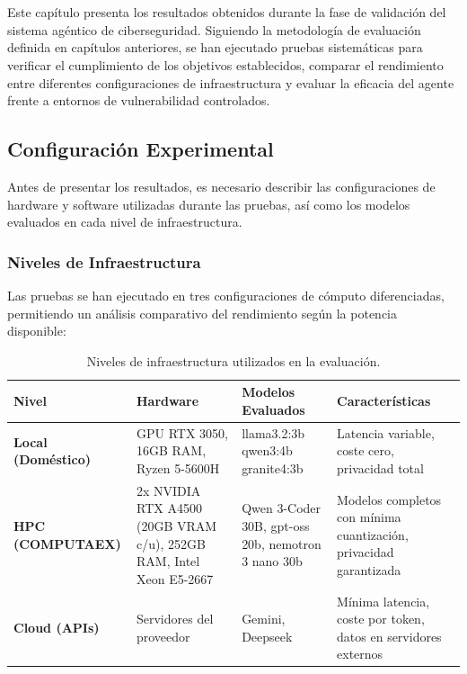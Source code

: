 \chapter{\resultsname}

Este capítulo presenta los resultados obtenidos durante la fase de validación del sistema agéntico de ciberseguridad. Siguiendo la metodología de evaluación definida en capítulos anteriores, se han ejecutado pruebas sistemáticas para verificar el cumplimiento de los objetivos establecidos, comparar el rendimiento entre diferentes configuraciones de infraestructura y evaluar la eficacia del agente frente a entornos de vulnerabilidad controlados.


\section{Configuración Experimental}
\label{sec:configuracion_experimental}

Antes de presentar los resultados, es necesario describir las configuraciones de hardware y software utilizadas durante las pruebas, así como los modelos evaluados en cada nivel de infraestructura.

\subsection{Niveles de Infraestructura}

Las pruebas se han ejecutado en tres configuraciones de cómputo diferenciadas, permitiendo un análisis comparativo del rendimiento según la potencia disponible:

\begin{table}[H]
\centering
\renewcommand{\arraystretch}{1.3}
\begin{tabular}{|l|p{4cm}|p{4cm}|p{3.5cm}|}
\hline
\rowcolor[gray]{0.85}
\textbf{Nivel} & \textbf{Hardware} & \textbf{Modelos Evaluados} & \textbf{Características} \\
\hline
\textbf{Local (Doméstico)} & 
GPU RTX 3050, 16GB RAM, Ryzen 5-5600H & 
llama3.2:3b
qwen3:4b
granite4:3b & 
Latencia variable, coste cero, privacidad total \\
\hline
\textbf{HPC (COMPUTAEX)} & 
2x NVIDIA RTX A4500 (20GB VRAM c/u), 252GB RAM, Intel Xeon E5-2667 & 
Qwen 3-Coder 30B, gpt-oss 20b, nemotron 3 nano 30b & 
Modelos completos con mínima cuantización, privacidad garantizada \\
\hline
\textbf{Cloud (APIs)} & 
Servidores del proveedor & Gemini, Deepseek & 
Mínima latencia, coste por token, datos en servidores externos \\
\hline
\end{tabular}
\caption{Niveles de infraestructura utilizados en la evaluación.}
\label{tab:niveles_infraestructura}
\end{table}

